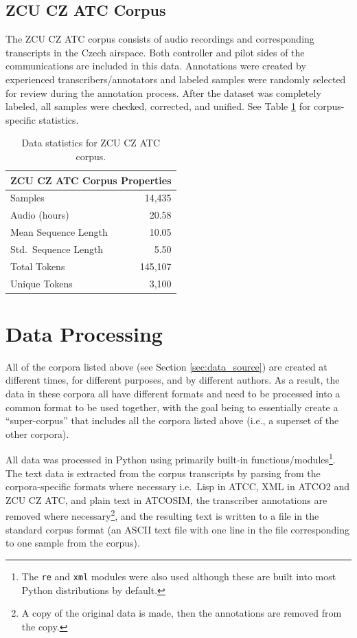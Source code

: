 \documentclass[12pt]{article}
\begin{document}
\subsection{ZCU CZ ATC Corpus}\label{sec:zcu_atc}
The ZCU CZ ATC corpus consists of audio recordings and corresponding transcripts in the Czech airspace. Both controller and pilot sides of the
communications are included in this data. Annotations were created by experienced transcribers/annotators and labeled samples were randomly selected
for review during the annotation process. After the dataset was completely labeled, all samples were checked, corrected, and
unified\cite{smidl_air_2019}. See Table \ref{tab:zcu_cz_atc_stats} for corpus-specific statistics.

\begin{table}
    \centering
    \begin{tabular}{l r}
        \toprule
        \multicolumn{2}{c}{ZCU CZ ATC Corpus Properties} \\
        \midrule
        Samples              & 14,435                    \\
        Audio (hours)        & 20.58                     \\
        Mean Sequence Length & 10.05                     \\
        Std.~Sequence Length & 5.50                      \\
        Total Tokens         & 145,107                   \\
        Unique Tokens        & 3,100                     \\
        \bottomrule
    \end{tabular}
    \caption{Data statistics for ZCU CZ ATC corpus.}
    \label{tab:zcu_cz_atc_stats}
\end{table}

\section{Data Processing}\label{sec:data_processing}
All of the corpora listed above (see Section \ref{sec:data_source}) are created at different times, for different purposes, and by different authors.
As a result, the data in these corpora all have different formats and need to be processed into a common format to be used together, with the goal
being to essentially create a ``super-corpus'' that includes all the corpora listed above (i.e., a superset of the other corpora).

All data was processed in Python using primarily built-in functions/modules\footnote{The \lstinline|re| and \lstinline|xml| modules were also used
    although these are built into most Python distributions by default.}. The text data is extracted from the corpus transcripts by parsing from the
corpora-specific formats where necessary i.e.~Lisp in ATCC, XML in ATCO2 and ZCU CZ ATC, and plain text in ATCOSIM, the transcriber annotations
are removed where necessary\footnote{A copy of the original data is made, then the annotations are removed from the copy.}, and the resulting text
is written to a file in the standard corpus format (an ASCII text file with one line in the file corresponding to one sample from the corpus).
\end{document}
